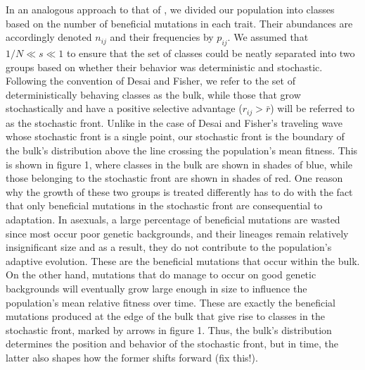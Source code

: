 \documentclass[11pt,twocolumn]{article}
\begin{document}
In an analogous approach to that of \cite{desai2007beneficial}, we divided our population into classes based on the number of beneficial mutations in each trait. Their abundances are accordingly denoted $n_{ij}$ and their frequencies by $p_{ij}$. We assumed that $1/N \ll s \ll 1$ to ensure that the set of classes could be neatly separated into two groups based on whether their behavior was deterministic and stochastic. Following the convention of Desai and Fisher, we refer to the set of deterministically behaving classes as the bulk, while those that grow stochastically and have a positive selective advantage ($r_{ij}>\bar{r}$) will be referred to as the stochastic front. Unlike in the case of Desai and Fisher's  traveling wave whose stochastic front is a single point, our stochastic front is the boundary of the bulk's distribution above the line crossing the population's mean fitness. This is shown in figure 1, where classes in the bulk are shown in shades of blue, while those belonging to the stochastic front are shown in shades of red. One reason why the growth of these two groups is treated differently has to do with the fact that only beneficial mutations in the stochastic front are consequential to adaptation. In asexuals, a large percentage of beneficial mutations are wasted since most occur poor genetic backgrounds, and their lineages remain relatively insignificant size and as a result, they do not contribute to the population's adaptive evolution. These are the beneficial mutations that occur within the bulk. On the other hand, mutations that do manage to occur on good genetic backgrounds will eventually grow large enough in size to influence the population's mean relative fitness over time. These are exactly the beneficial mutations produced at the edge of the bulk that give rise to classes in the stochastic front, marked by arrows in figure 1. Thus, the bulk's distribution determines the position and behavior of the stochastic front, but in time, the latter also shapes how the former shifts forward (fix this!).\par
% 
% 
% 
%
\end{document}
